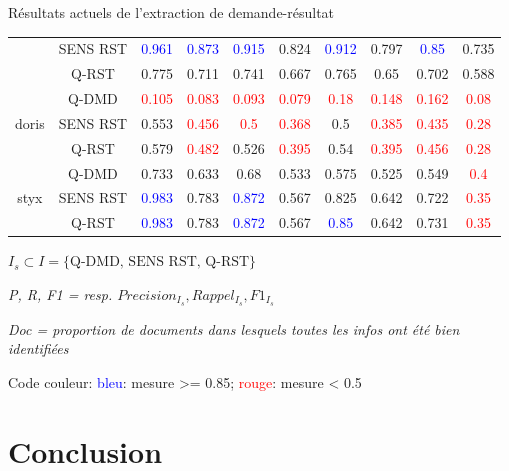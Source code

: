 \documentclass[newPxFont,pagenumber]{beamer}
\begin{document}
\begin{frame}{Résultats actuels de l'extraction de demande-résultat}
\begin{center}
\begin{tabular}{|c||c||c|c|c|c||c|c|c|c|}
 & SENS RST & \textcolor{blue}{0.961} & \textcolor{blue}{0.873} & \textcolor{blue}{0.915} & 0.824 &  \textcolor{blue}{0.912} & 0.797 & \textcolor{blue}{0.85} & 0.735  \\
 & Q-RST & 0.775 & 0.711 & 0.741 & 0.667 &  0.765 & 0.65 & 0.702 & 0.588 \\ \hline
\multirow{3}{*}{doris} & Q-DMD & \textcolor{red}{0.105} & \textcolor{red}{0.083} & \textcolor{red}{0.093} & \textcolor{red}{0.079} & \textcolor{red}{0.18} & \textcolor{red}{0.148} & \textcolor{red}{0.162}  & \textcolor{red}{0.08}  \\
 & SENS RST & 0.553 & \textcolor{red}{0.456} & \textcolor{red}{0.5} & \textcolor{red}{0.368} & 0.5 & \textcolor{red}{0.385} & \textcolor{red}{0.435} & \textcolor{red}{0.28}   \\
 & Q-RST & 0.579 & \textcolor{red}{0.482} & 0.526 & \textcolor{red}{0.395} & 0.54 & \textcolor{red}{0.395} & \textcolor{red}{0.456} & \textcolor{red}{0.28}   \\ \hline
\multirow{3}{*}{styx} & Q-DMD & 0.733 & 0.633 & 0.68 & 0.533 & 0.575 & 0.525 & 0.549 & \textcolor{red}{0.4}  \\
 & SENS RST & \textcolor{blue}{0.983} & 0.783 & \textcolor{blue}{0.872} & 0.567 & 0.825 & 0.642 & 0.722 & \textcolor{red}{0.35} \\
 & Q-RST & \textcolor{blue}{0.983} & 0.783 & \textcolor{blue}{0.872} & 0.567 &   \textcolor{blue}{0.85} & 0.642 & 0.731 & \textcolor{red}{0.35}  \\ \hline
\end{tabular} 
\end{center}
\tiny

$I_s \subset I = \lbrace \text{Q-DMD, SENS RST, Q-RST} \rbrace$

\textit{P, R, F1 = resp. $Precision_{I_s}, Rappel_{I_s}, F1_{I_s}$}

\textit{Doc = proportion de documents dans lesquels toutes les infos ont été bien identifiées}

Code couleur: \textcolor{blue}{bleu}: mesure >= 0.85;  \textcolor{red}{rouge}: mesure < 0.5
\end{frame}

\section{Conclusion}
\end{document}
